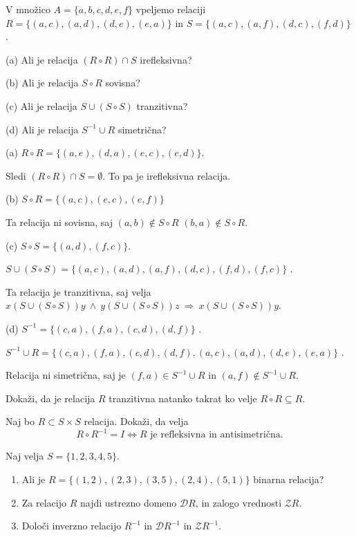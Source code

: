 \documentclass[11pt,paper=b5,footinclude,headinclude]{scrbook} %
\def\inn {{~\wedge~}}
\def\sledi {{~\Rightarrow~}}
\newtheorem{ex}{Vaja\hypertarget{sol:\theex}}[chapter]
\begin{document}
\begin{ex}
V množico $A = \{a, b, c, d, e, f \}$ vpeljemo relaciji
$R = \{(a, c), (a, d), (d, e), (e, a)\}$ in
$S = \{(a, c), (a, f), (d, c), (f, d)\}$ .

(a) Ali je relacija $(R\circ R)\cap S$ irefleksivna?

(b) Ali je relacija $S\circ R$ sovisna?

(c) Ali je relacija $S\cup (S\circ S)$ tranzitivna?

(d) Ali je relacija $S^{-1}\cup R$ simetrična?
\begin{sol}
    
(a)
$R\circ R = \{(a,e), (d,a), (e,c), (e,d)\}$.

Sledi
$(R\circ R)\cap S = \emptyset$. To pa je irefleksivna relacija.

(b) $S\circ R = \{(a,c), (e,c), (e,f)\}$

Ta relacija ni sovisna, saj $(a,b)\not\in S\circ R$
$(b,a)\not\in S\circ R$.

(c)
$S\circ S = \{(a,d), (f,c)\}$.

$S\cup (S\circ S)= \{(a, c), (a,d), (a, f), (d, c), (f, d), (f,c)\}$ .

Ta relacija je tranzitivna, saj velja $x(S\cup (S\circ S))y\inn
y(S\cup (S\circ S))z\sledi x(S\cup (S\circ S))y$.

(d)
$S^{-1} = \{(c, a), (f, a), (c, d), (d, f)\}$ .

$S^{-1}\cup R = \{(c, a), (f, a), (c, d), (d, f),
(a, c), (a, d), (d, e), (e, a)\}$ .

Relacija ni simetrična, saj je $(f,a)\in S^{-1}\cup R$ in $(a,f)\not\in S^{-1}\cup R$.
\end{sol}
\end{ex}

\begin{ex}
    Dokaži, da je relacija $R$ tranzitivna natanko takrat ko velje $R\circ R\subseteq R$.
\end{ex}

\begin{ex}
    Naj bo $R\subset S\times S$ relacija. Dokaži, da velja
    \[
    R\circ R^{-1} =I \iff R \text{ je refleksivna in antisimetrična.}
    \]
\end{ex}

\begin{ex}
    Naj velja $S=\{1,2,3,4,5\}$. 
\begin{enumerate}
    \item Ali je  $R=\{(1,2),(2,3), (3,5), (2,4), (5,1)\}$ binarna relacija?
    \item Za relacijo $R$ najdi ustrezno domeno $\mathcal{D} R$, in zalogo vrednosti $\mathcal{Z} R$.
    \item 
  Določi inverzno relacijo $R^{-1}$ in  $\mathcal{D} R^{-1}$ in  $\mathcal{Z} R^{-1}$.
\end{enumerate}
\end{ex}
\end{document}
